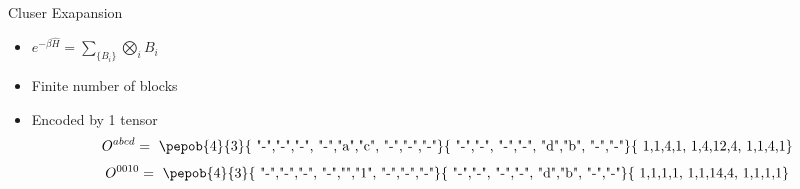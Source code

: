 \begin{frame}{Cluser Exapansion}
\begin{minipage}{0.49\textwidth}
{            \begin{itemize}
                \item $ e^{-\beta \hat{H}} = \sum_{ \{B_i\} } \bigotimes_i B_i  $
                \item Finite number of blocks
                \item Encoded by 1 tensor
                      \begin{equation}
                          O^{abcd} = \vcenter{ \hbox{ \pepob{4}{3}{{
                                              "-","-","-",
                                              "-","a","c",
                                              "-","-","-"}}{{
                                              "-","-",
                                              "-","-",
                                              "d","b",
                                              "-","-"}}{{
                                              1,1,4,1,
                                              1,4,12,4,
                                              1,1,4,1}} }}
                      \end{equation}
                      \begin{equation}
                          O^{0010} = \vcenter{ \hbox{ \pepob{4}{3}{{
                                              "-","-","-",
                                              "-","","1",
                                              "-","-","-"}}{{
                                              "-","-",
                                              "-","-",
                                              "d","b",
                                              "-","-"}}{{
                                              1,1,1,1,
                                              1,1,14,4,
                                              1,1,1,1}} }}
                      \end{equation}

            \end{itemize}

        }

         {
            \clustFullB
        }

    \end{minipage}
\end{frame}


